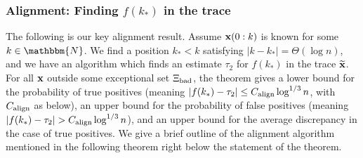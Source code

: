 \documentclass[final,12pt]{colt2018} %
\newcommand{\N}{\mathbbm{N}}
\newcommand{\1}{\mathbf{1}}
\newcommand{\wt}{\widetilde}
\def\x{{\bf x}}
\def\calign{C_{\rm align}}
\def\bad{{\Xi_{\rm bad}}}
\begin{document}
\subsubsection*{Alignment: Finding $f(k_*)$ in the trace}
The following is our key alignment result. Assume $\x(0:k)$ is known for some $k\in\N$. We find a position $k_*<k$ satisfying $|k-k_*|=\Theta(\log n)$, and we have an algorithm which finds an estimate $\tau_2$ for $f(k_*)$ in the trace $\wt\x$. For all $\x$ outside some exceptional set $\bad$, the theorem gives
a lower bound for the probability of true positives (meaning $|f(k_*)-\tau_2|\leq \calign\log^{1/3} n$, with $\calign$ as below),
an upper bound for the probability of false positives (meaning $|f(k_*)-\tau_2|> \calign\log^{1/3} n$), and
an upper bound for the average discrepancy in the case of true positives. We give a brief outline of the alignment algorithm mentioned in the following theorem right below the statement of the theorem.
\end{document}
